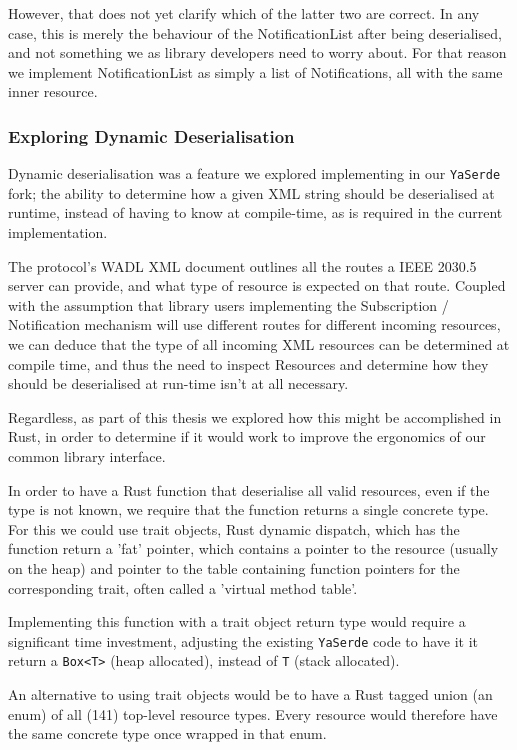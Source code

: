 However, that does not yet clarify which of the latter two are correct. In any case, this is merely the behaviour of the NotificationList after being deserialised, and not something we as library developers need to worry about. For that reason we implement NotificationList as simply a list of Notifications, all with the same inner resource.

\subsubsection{Exploring Dynamic Deserialisation}
Dynamic deserialisation was a feature we explored implementing in our \texttt{YaSerde} fork; the ability to determine how a given XML string should be deserialised at runtime, instead of having to know at compile-time, as is required in the current implementation.

The protocol's WADL XML document outlines all the routes a IEEE 2030.5 server can provide, and what type of resource is expected on that route. Coupled with the assumption that library users implementing the Subscription / Notification mechanism will use different routes for different incoming resources, we can deduce that the type of all incoming XML resources can be determined at compile time, and thus the need to inspect Resources and determine how they should be deserialised at run-time isn't at all necessary. 

Regardless, as part of this thesis we explored how this might be accomplished in Rust, in order to determine if it would work to improve the ergonomics of our common library interface.

In order to have a Rust function that deserialise all valid resources, even if the type is not known, we require that the function returns a single concrete type. For this we could use trait objects, Rust dynamic dispatch, which has the function return a 'fat' pointer, which contains a pointer to the resource (usually on the heap) and pointer to the table containing function pointers for the corresponding trait, often called a 'virtual method table'. 

Implementing this function with a trait object return type would require a significant time investment, adjusting the existing \texttt{YaSerde} code to have it it return a \texttt{Box<T>} (heap allocated), instead of \texttt{T} (stack allocated).

An alternative to using trait objects would be to have a Rust tagged union (an enum) of all (141) top-level resource types. Every resource would therefore have the same concrete type once wrapped in that enum.

